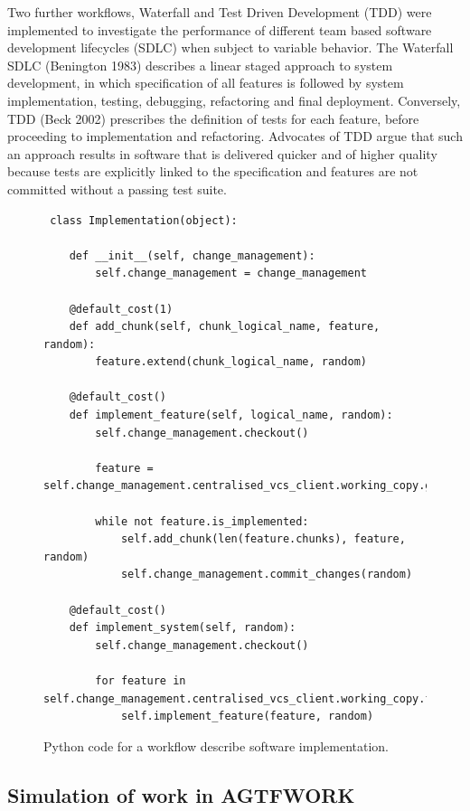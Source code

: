 \documentclass{llncs}
\begin{document}
Two further workflows, Waterfall and Test Driven Development (TDD) were implemented to investigate the performance of
different team based software development lifecycles (SDLC) when subject to variable behavior.  The Waterfall SDLC
(Benington 1983) describes a linear staged approach to system development, in which specification of all features is
followed by system implementation, testing, debugging, refactoring and final deployment.  Conversely, TDD (Beck 2002)
prescribes the definition of tests for each feature, before proceeding to implementation and refactoring.  Advocates of
TDD argue that such an approach results in software that is delivered quicker and of higher quality because tests are
explicitly linked to the specification and features are not committed without a passing test suite.

\begin{figure}
  \centering
\begin{lstlisting}
 class Implementation(object):

    def __init__(self, change_management):
        self.change_management = change_management

    @default_cost(1)
    def add_chunk(self, chunk_logical_name, feature, random):
        feature.extend(chunk_logical_name, random)

    @default_cost()
    def implement_feature(self, logical_name, random):
        self.change_management.checkout()

        feature = self.change_management.centralised_vcs_client.working_copy.get_feature(logical_name)

        while not feature.is_implemented:
            self.add_chunk(len(feature.chunks), feature, random)
            self.change_management.commit_changes(random)

    @default_cost()
    def implement_system(self, random):
        self.change_management.checkout()

        for feature in self.change_management.centralised_vcs_client.working_copy.features:
            self.implement_feature(feature, random)

\end{lstlisting}
  \caption{Python code for a workflow describe software implementation.}
  \label{fig:implementation-workflow}

\end{figure}

\subsection{Simulation of work in AGTFWORK}
\end{document}
